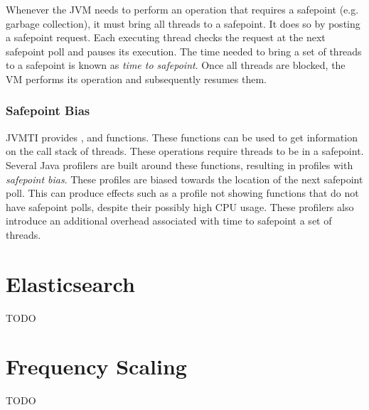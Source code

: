 Whenever the JVM needs to perform an operation that requires a safepoint (e.g. garbage collection), it must bring all threads to a safepoint. It does so by posting a safepoint request. Each executing thread checks the request at the next safepoint poll and pauses its execution. The time needed to bring a set of threads to a safepoint is known as \emph{time to safepoint}. Once all threads are blocked, the VM performs its operation and subsequently resumes them.

\subsubsection*{Safepoint Bias}

JVMTI provides ,  and  functions. These functions can be used to get information on the call stack of threads. These operations require threads to be in a safepoint. Several Java profilers are built around these functions, resulting in profiles with \emph{safepoint bias}. These profiles are biased towards the location of the next safepoint poll. This can produce effects such as a profile not showing functions that do not have safepoint polls, despite their possibly high CPU usage. These profilers also introduce an additional overhead associated with time to safepoint a set of threads.



\section{Elasticsearch}

TODO

\section{Frequency Scaling}

TODO








\iffalse

